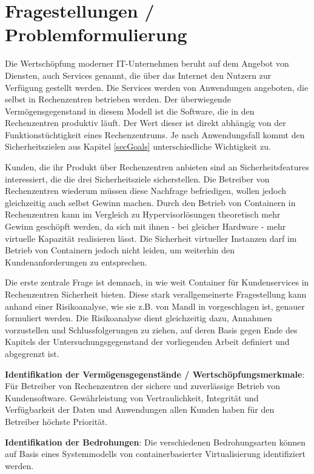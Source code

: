 \documentclass[../main.tex]{subfiles}
\begin{document}
\chapter{Fragestellungen / Problemformulierung}
\label{question}
  Die Wertschöpfung moderner IT-Unternehmen beruht auf dem Angebot von Diensten, auch Services genannt, die über das Internet den Nutzern zur Verfügung gestellt werden. Die Services werden von Anwendungen angeboten, die selbst in Rechenzentren betrieben werden. Der überwiegende Vermögensgegenstand in diesem Modell ist die Software, die in den Rechenzentren produktiv läuft. Der Wert dieser ist direkt abhängig von der Funktionstüchtigkeit eines Rechenzentrums. Je nach Anwendungsfall kommt den Sicherheitszielen aus Kapitel \ref{secGoals} unterschiedliche Wichtigkeit zu.

  Kunden, die ihr Produkt über Rechenzentren anbieten sind an Sicherheitsfeatures interessiert, die die drei Sicherheitsziele sicherstellen. Die Betreiber von Rechenzentren wiederum müssen diese Nachfrage befriedigen, wollen jedoch gleichzeitig auch selbst Gewinn machen. Durch den Betrieb von Containern in Rechenzentren kann im Vergleich zu Hypervisorlösungen theoretisch mehr Gewinn geschöpft werden, da sich mit ihnen - bei gleicher Hardware - mehr virtuelle Kapazität realisieren lässt. Die Sicherheit virtueller Instanzen darf im Betrieb von Containern jedoch nicht leiden, um weiterhin den Kundenanforderungen zu entsprechen.

  Die erste zentrale Frage ist demnach, in wie weit Container für Kundenservices in Rechenzentren Sicherheit bieten. Diese stark verallgemeinerte Fragestellung kann anhand einer Risikoanalyse, wie sie z.B. von Mandl in \cite[S.36]{CISSP} vorgeschlagen ist, genauer formuliert werden. Die Risikoanalyse dient gleichzeitig dazu, Annahmen vorzustellen und Schlussfolgerungen zu ziehen, auf deren Basis gegen Ende des Kapitels der Untersuchungsgegenstand der vorliegenden Arbeit definiert und abgegrenzt ist.

  \textbf{Identifikation der Vermögensgegenstände / Wertschöpfungsmerkmale}: Für Betreiber von Rechenzentren der sichere und zuverlässige Betrieb von Kundensoftware. Gewährleistung von Vertraulichkeit, Integrität und Verfügbarkeit der Daten und Anwendungen allen Kunden haben für den Betreiber höchste Priorität.

  \textbf{Identifikation der Bedrohungen}: Die verschiedenen Bedrohungsarten können auf Basis eines Systemmodells von containerbasierter Virtualisierung identifiziert werden.
\end{document}
